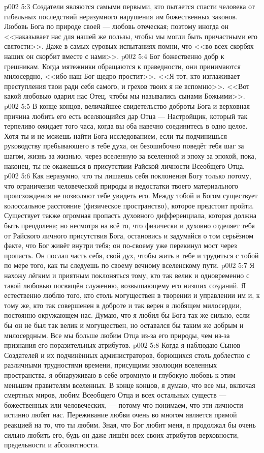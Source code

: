 \vs p002 5:3 Создатели являются самыми первыми, кто пытается спасти человека от гибельных последствий неразумного нарушения им божественных законов. Любовь Бога по природе своей --- любовь отеческая; поэтому иногда он <<наказывает нас для нашей же пользы, чтобы мы могли быть причастными его святости>>. Даже в самых суровых испытаниях помни, что <<во всех скорбях наших он скорбит вместе с нами>>.
\vs p002 5:4 Бог божественно добр к грешникам. Когда мятежники обращаются к праведности, они принимаются милосердно, <<ибо наш Бог щедро простит>>. <<Я тот, кто изглаживает преступления твои ради себя самого, и грехов твоих я не вспомню>>. <<Вот какой любовью одарил нас Отец, чтобы мы назывались сынами Божьими>>.
\vs p002 5:5 В конце концов, величайшее свидетельство доброты Бога и верховная причина любить его есть вселяющийся дар Отца --- Настройщик, который так терпеливо ожидает того часа, когда вы оба навечно соединитесь в одно целое. Хотя ты и не можешь найти Бога исследованием, если ты подчинишься руководству пребывающего в тебе духа, он безошибочно поведёт тебя шаг за шагом, жизнь за жизнью, через вселенную за вселенной и эпоху за эпохой, пока, наконец, ты не окажешься в присутствии Райской личности Всеобщего Отца.
\vs p002 5:6 \pc Как неразумно, что ты лишаешь себя поклонения Богу только потому, что ограничения человеческой природы и недостатки твоего материального происхождения не позволяют тебе увидеть его. Между тобой и Богом существует колоссальное расстояние (физическое пространство), которое предстоит пройти. Существует также огромная пропасть духовного дифференциала, которая должна быть преодолена; но несмотря на всё то, что физически и духовно отделяет тебя от Райского личного присутствия Бога, остановись и задумайся о том серьёзном факте, что Бог живёт внутри тебя; он по\hyp{}своему уже перекинул мост через пропасть. Он послал часть себя, свой дух, чтобы жить в тебе и трудиться с тобой по мере того, как ты следуешь по своему вечному вселенскому пути.
\vs p002 5:7 Я нахожу лёгким и приятным поклоняться тому, кто так велик и одновременно с такой любовью посвящён служению, возвышающему его низших созданий. Я естественно люблю того, кто столь могуществен в творении и управлении им и, к тому же, кто так совершенен в доброте и так верен в любящем милосердии, постоянно окружающем нас. Думаю, что я любил бы Бога так же сильно, если бы он не был так велик и могуществен, но оставался бы таким же добрым и милосердным. Все мы больше любим Отца из\hyp{}за его природы, чем из\hyp{}за признания его поразительных атрибутов.
\vs p002 5:8 Когда я наблюдаю Сынов Создателей и их подчинённых администраторов, борющихся столь доблестно с различными трудностями времени, присущими эволюции вселенных пространства, я обнаруживаю в себе огромную и глубокую любовь к этим меньшим правителям вселенных. В конце концов, я думаю, что все мы, включая смертных миров, любим Всеобщего Отца и всех остальных существ --- божественных или человеческих, --- потому что понимаем, что эти личности истинно любят нас. Переживание любви очень во многом является прямой реакцией на то, что ты любим. Зная, что Бог любит меня, я продолжал бы очень сильно любить его, будь он даже лишён всех своих атрибутов верховности, предельности и абсолютности.
